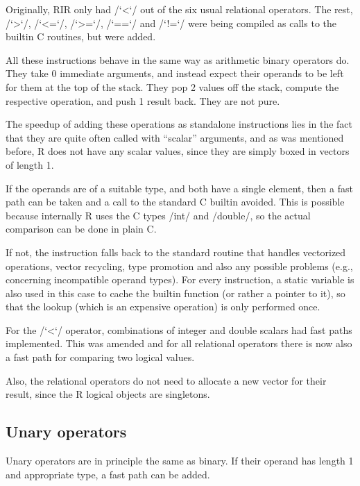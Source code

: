 Originally, RIR only had \rinline/`<`/ out of the six usual relational operators. The rest, \rinline/`>`/, \rinline/`<=`/, \rinline/`>=`/, \rinline/`==`/ and \rinline/`!=`/ were being compiled as calls to the builtin C routines, but were added.

All these instructions behave in the same way as arithmetic binary operators do. They take 0 immediate arguments, and instead expect their operands to be left for them at the top of the stack. They pop 2 values off the stack, compute the respective operation, and push 1 result back. They are not pure\todo[why].

The speedup of adding these operations as standalone instructions lies in the fact that they are quite often called with ``scalar'' arguments, and as was mentioned before, R does not have any scalar values, since they are simply boxed in vectors of length 1.

If the operands are of a suitable type, and both have a single element, then a fast path can be taken and a call to the standard C builtin avoided. This is possible because internally R uses the C types \cinline/int/ and \cinline/double/, so the actual comparison can be done in plain C.

If not, the instruction falls back to the standard routine that handles vectorized operations, vector recycling, type promotion and also any possible problems (e.g., concerning incompatible operand types). For every instruction, a static variable is also used in this case to cache the builtin function (or rather a pointer to it), so that the lookup (which is an expensive operation) is only performed once.

For the \rinline/`<`/ operator, combinations of integer and double scalars had fast paths implemented. This was amended and for all relational operators there is now also a fast path for comparing two logical values.

Also, the relational operators do not need to allocate a new vector for their result, since the R logical objects are singletons.


\subsection{Unary operators}

Unary operators are in principle the same as binary. If their operand has length 1 and appropriate type, a fast path can be added.

